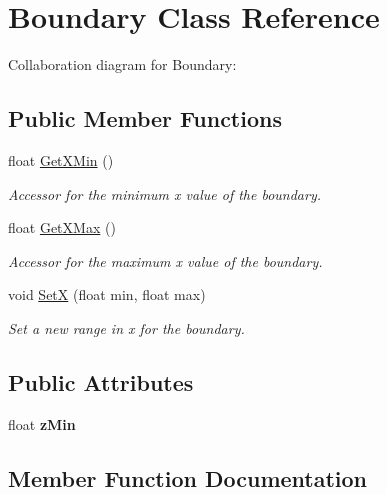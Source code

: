 \hypertarget{class_boundary}{}\section{Boundary Class Reference}
\label{class_boundary}


Collaboration diagram for Boundary\+:
\subsection*{Public Member Functions}
\begin{DoxyCompactItemize}
\item 
float \mbox{\hyperlink{class_boundary_aad22a17a16d35571a86617ec1463a835}{Get\+X\+Min}} ()
\begin{DoxyCompactList}\small\item\em Accessor for the minimum x value of the boundary. \end{DoxyCompactList}\item 
float \mbox{\hyperlink{class_boundary_af72d98e6c2b86e0237901a833d8f77b5}{Get\+X\+Max}} ()
\begin{DoxyCompactList}\small\item\em Accessor for the maximum x value of the boundary. \end{DoxyCompactList}\item 
void \mbox{\hyperlink{class_boundary_a5f3b05328e51a92d0fa7ddc5556b6c33}{SetX}} (float min, float max)
\begin{DoxyCompactList}\small\item\em Set a new range in x for the boundary. \end{DoxyCompactList}\end{DoxyCompactItemize}
\subsection*{Public Attributes}
\begin{DoxyCompactItemize}
\item 
\mbox{\label{class_boundary_a69e0d35c4e1591bffb1e08303f927a42}} 
float {\bfseries z\+Min}
\end{DoxyCompactItemize}


\subsection{Member Function Documentation}
\mbox{\label{class_boundary_af72d98e6c2b86e0237901a833d8f77b5}} 
